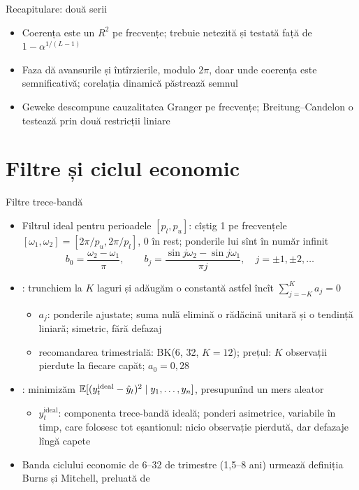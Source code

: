 \begin{frame}{Recapitulare: două serii}
\itemsize{\small}
\begin{itemize}
    \item Coerența este un $R^2$ pe frecvențe; trebuie netezită și testată față de $1 - \alpha^{1/(L-1)}$
    \item Faza dă avansurile și întîrzierile, modulo $2\pi$, doar unde coerența este semnificativă; corelația dinamică păstrează semnul
    \item Geweke descompune cauzalitatea Granger pe frecvențe; Breitung--Candelon o testează prin două restricții liniare
\end{itemize}
\end{frame}


\section{Filtre și ciclul economic}

\begin{frame}{Filtre trece-bandă}
\itemsize{\small}
\begin{itemize}
    \item Filtrul ideal pentru perioadele $[p_l, p_u]$: cîștig 1 pe frecvențele $[\omega_1, \omega_2] = [2\pi/p_u, 2\pi/p_l]$, 0 în rest; ponderile lui sînt în număr infinit
    \[ b_0 = \frac{\omega_2 - \omega_1}{\pi}, \qquad b_j = \frac{\sin j\omega_2 - \sin j\omega_1}{\pi j}, \quad j = \pm1, \pm2, \dots \]
    \item {}: trunchiem la $K$ laguri și adăugăm o constantă astfel încît $\sum_{j=-K}^Ka_j = 0$
    \begin{itemize}
        \item $a_j$: ponderile ajustate; suma nulă elimină o rădăcină unitară și o tendință liniară; simetric, fără defazaj
        \item recomandarea trimestrială: BK(6, 32, $K = 12$); prețul: $K$ observații pierdute la fiecare capăt; $a_0 = 0{,}28$
    \end{itemize}
    \item {}: minimizăm $\mathbb{E}[(y^{\mathrm{ideal}}_t - \hat y_t)^2 \mid y_1, \dots, y_n]$, presupunînd un mers aleator
    \begin{itemize}
        \item $y^{\mathrm{ideal}}_t$: componenta trece-bandă ideală; ponderi asimetrice, variabile în timp, care folosesc tot eșantionul: nicio observație pierdută, dar defazaje lîngă capete
    \end{itemize}
    \item Banda ciclului economic de 6--32 de trimestre (1,5--8 ani) urmează definiția Burns și Mitchell, preluată de 
\end{itemize}
\end{frame}

